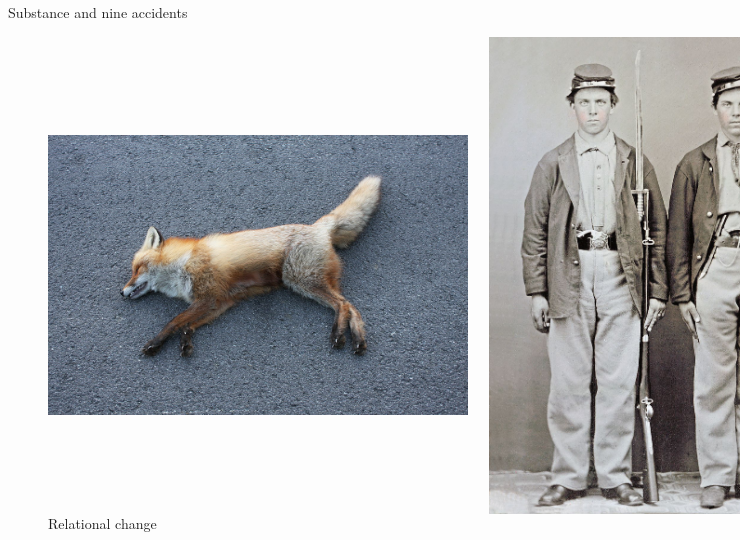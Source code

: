 \documentclass[xcolor=dvipsnames]{beamer}
\begin{document}
\begin{frame}{Substance and nine accidents}
\begin{figure}
  \centering
  \begin{columns}
    \centering
    \caption {Substantial change}
    \includegraphics[width=0.99\textwidth]{fox}
    \centering
    \caption {Relational change}
    \includegraphics[width=0.9\textwidth]{relation}
  \end{columns}
\end{figure}
\end{frame}
\end{document}
